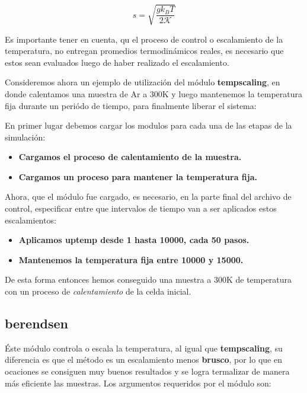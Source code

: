 $$s=\sqrt{\frac{gk_BT}{2\mathcal{K}}}$$

Es importante tener en cuenta, qu el proceso de control o escalamiento de la temperatura, no entregan promedios termodin\'amicos reales, es necesario que estos sean evaluados luego de haber realizado el escalamiento.

Consideremos ahora un ejemplo de utilizaci\'on del m\'odulo \textbf{tempscaling}, en donde calentamos una muestra de Ar a 300K y luego mantenemos la temperatura fija durante un peri\'odo de tiempo, para finalmente liberar el sistema:

En primer lugar debemos cargar los modulos para cada una de las etapas de la simulaci\'on:

\begin{itemize}
 \item \textbf{Cargamos el proceso de calentamiento de la muestra.}
 \item \textbf{Cargamos un proceso para mantener la temperatura fija.}
\end{itemize}

Ahora, que el m\'odulo fue cargado, es necesario, en la parte final del archivo de control, especificar entre que intervalos de tiempo van a ser aplicados estos escalamientos:

\begin{itemize}
 \item \textbf{Aplicamos \textbf{uptemp} desde 1 hasta 10000, cada 50 pasos.}
 \item \textbf{Mantenemos la temperatura fija entre 10000 y 15000.}
\end{itemize}

De esta forma entonces hemos conseguido una muestra a 300K de temperatura con un proceso de \textit{calentamiento} de la celda inicial.

\subsection{berendsen}
\'Este m\'odulo controla o escala la temperatura, al igual que \textbf{tempscaling}, su diferencia es que el m\'etodo es un escalamiento menos \textbf{brusco}, por lo que en ocaciones se consiguen muy buenos resultados y se logra termalizar de manera m\'as eficiente las muestras. Los argumentos requeridos por el m\'odulo son:


